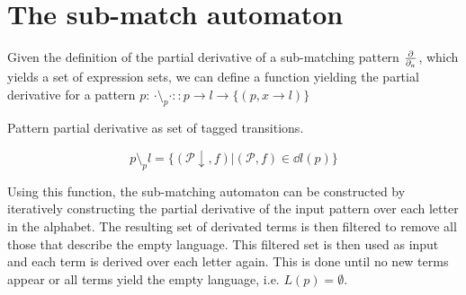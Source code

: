 \section{The sub-match automaton}
\label{nfa}

Given the definition of the partial derivative of a sub-matching pattern $\frac{\partial}{\partial_{a}}$,
which yields a set of expression sets, we can define a function yielding the
partial derivative for a pattern $p$: $\cdot \setminus_p \cdot :: p \to l \to
\{(p, x \to l)\}$

\begin{defn}
   Pattern partial derivative as set of tagged transitions.

   \[p \setminus_p l = \{ (\mathcal{P}\downarrow, f) | (\mathcal{P}, f) \in \dd{l}(p) \}\]
\end{defn}

Using this function, the sub-matching automaton can be constructed by
iteratively constructing the partial derivative of the input pattern over each
letter in the alphabet. The resulting set of derivated terms is then filtered to
remove all those that describe the empty language. This filtered set is then
used as input and each term is derived over each letter again. This is done
until no new terms appear or all terms yield the empty language, i.e. $L(p) =
\emptyset$.

